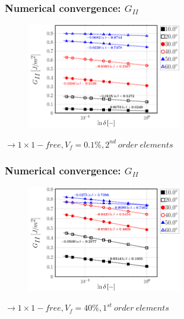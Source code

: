 \documentclass[first,firstsupp,lastsupp,last,hyperref,table]{ETHclass}
\begin{document}
\begin{frame}
\frametitle{\vspace{0.25cm}\small Numerical convergence: $G_{II}$}
\vspace{-.75cm}
\centering
\begin{figure}
\centering
\includegraphics[width=0.6\textwidth]{Vf0_1-free-2nd-semilogvsDelta-GII.pdf}
\end{figure}
$\rightarrow 1\times1-free, V_{f}=0.1\%, 2^{nd}\ order\ elements$ 
\end{frame}

\addtocounter{framenumber}{-1}

\begin{frame}
\frametitle{\vspace{0.25cm}\small Numerical convergence: $G_{II}$}
\vspace{-.75cm}
\centering
\begin{figure}
\centering
\includegraphics[width=0.6\textwidth]{Vf40-free-1st-semilogvsDelta-GII.pdf}
\end{figure}
$\rightarrow 1\times1-free, V_{f}=40\%, 1^{st}\ order\ elements$ 
\end{frame}

\addtocounter{framenumber}{-1}
\end{document}
